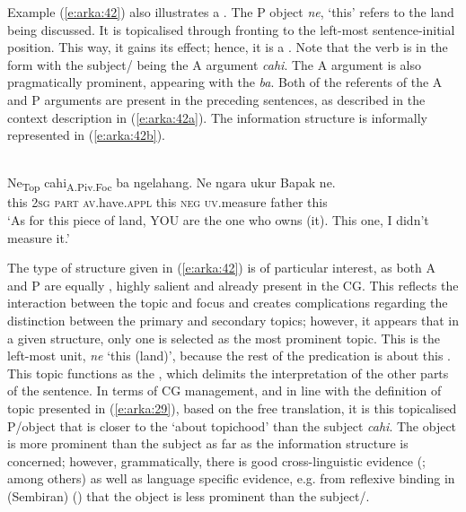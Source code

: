 \documentclass[output=paper
,modfonts
,nonflat]{langsci/langscibook}
\begin{document}
Example (\ref{e:arka:42}) also illustrates a . The P object \textit{ne}, ‘this’ refers to the land being discussed. It is topicalised through fronting to the left-most sentence-initial position. This way, it gains its  effect; hence, it is a . Note that the verb is in the  form with the subject/ being the A argument \textit{cahi}. The A argument is also pragmatically prominent, appearing with the  \textit{ba}. Both of the referents of the A and P arguments are present in the preceding sentences, as described in the context description in (\ref{e:arka:42a}). The information structure is informally represented in (\ref{e:arka:42b}). 

\begin{exe}
	\ex\label{e:arka:42}
	\begin{xlist}
		\label{e:arka:42a}\\
		\gll {\ob}Ne{\cb}\textsubscript{Top} {\ob}cahi{\cb}\textsubscript{A.Piv.Foc} ba ngelahang. Ne ngara ukur Bapak ne.\\
		this 2\textsc{sg} \textsc{part} \textsc{av}.have.\textsc{appl} this \textsc{neg} \textsc{uv}.measure father  this\\
		\glt ‘As for this piece of land, YOU are the one who owns (it). This one, I didn’t measure it.’
		\label{e:arka:42b}
	\end{xlist}
\end{exe}

\noindent
The type of structure given in (\ref{e:arka:42}) is of particular interest, as both A and P are equally , highly salient and already present in the CG. This reflects the interaction between the topic and focus and creates complications regarding the distinction between the primary and secondary topics; however, it appears that in a given structure, only one is selected as the most prominent topic. This is the left-most unit, \textit{ne} ‘this (land)’, because the rest of the predication is about this . This topic functions as the , which delimits the interpretation of the other parts of the sentence. In terms of CG management, and in line with the definition of topic presented in (\ref{e:arka:29}), based on the free translation, it is this topicalised P/object that is closer to the ‘about topichood’ than the subject \textit{cahi}. The object is more prominent than the subject as far as the information structure is concerned; however, grammatically, there is good cross-linguistic evidence (\citealt{Keenan1977,Bresnan2001}; among others) as well as language specific evidence, e.g. from reflexive binding in (Sembiran)  (\citealt{Arka2003,Sedeng2007}) that the object is less prominent than the subject/. 
\end{document}
